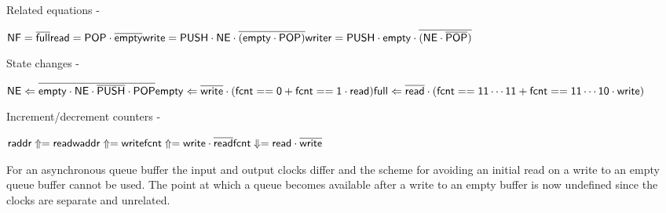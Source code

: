 \documentclass[10pt,a4paper,twoside,fleqn]{book}
\begin{document}
                    Related equations -
                    
                    $
                    \mathsf{NF = \overline{full}} \\
                    \mathsf{read = POP \cdot \overline{empty}} \\
                    \mathsf{write = PUSH \cdot NE \cdot \overline{(empty \cdot POP)}} \\
                    \mathsf{writer = PUSH \cdot empty \cdot \overline{(NE \cdot \overline{POP})}}
                    $
                    
                    State changes -
                    
                    $
                    \mathsf{NE \Leftarrow \overline{empty \cdot NE \cdot \overline{PUSH} \cdot POP}} \\
                    \mathsf{empty \Leftarrow \overline{write} \cdot (fcnt==0 + fcnt==1 \cdot read)} \\
                    \mathsf{full \Leftarrow \overline{read} \cdot (fcnt==11\cdots11 + fcnt==11\cdots10 \cdot write)}
                    $
                    
                    Increment/decrement counters -

                    $
                    \mathsf{raddr\Uparrow = read} \\
                    \mathsf{waddr\Uparrow = write} \\
                    \mathsf{fcnt\Uparrow = write \cdot \overline{read}} \\
                    \mathsf{fcnt\Downarrow = read \cdot \overline{write}}
                    $

                    For an asynchronous queue buffer the input and output clocks
                    differ and the scheme for avoiding an initial read on a
                    write to an empty queue buffer cannot be used. The point at
                    which a queue becomes available after a write to an empty
                    buffer is now undefined since the clocks are separate and
                    unrelated.
\end{document}
